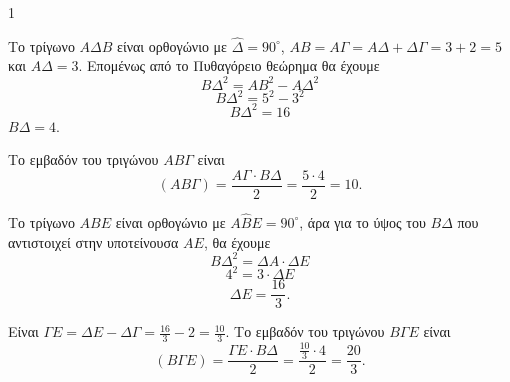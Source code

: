 \begin{ylh}{1}
    \item [ΛΥΣΗ]
\end{ylh}
\begin{alist}
    \item 
    \begin{rlist}
        \item Το τρίγωνο $ΑΔΒ$ είναι ορθογώνιο με $\hat{\Delta} = 90^\circ$,
        $ΑΒ = ΑΓ = ΑΔ + ΔΓ = 3 + 2 = 5$
        και $ΑΔ = 3$.
        Επομένως από το Πυθαγόρειο θεώρημα θα έχουμε
        \[ ΒΔ^2 = ΑΒ^2 - ΑΔ^2 \]
        \[ ΒΔ^2 = 5^2 - 3^2 \]
        \[ ΒΔ^2 = 16 \]
        $ΒΔ = 4$.
        
        \item Το εμβαδόν του τριγώνου $ΑΒΓ$ είναι
        \[ (ΑΒΓ) = \frac{ΑΓ \cdot ΒΔ}{2} = \frac{5 \cdot 4}{2} = 10. \]
    \end{rlist}
    
    \item 
    \begin{rlist}
        \item Το τρίγωνο $ΑΒΕ$ είναι ορθογώνιο με $Α\hat{Β}Ε = 90^\circ$, άρα για το ύψος του $ΒΔ$ που αντιστοιχεί στην υποτείνουσα $ΑΕ$, θα έχουμε
        \[ ΒΔ^2 = ΔΑ \cdot ΔΕ \]
        \[ 4^2 = 3 \cdot ΔΕ \]
        \[ ΔΕ = \frac{16}{3}. \]
        
        \item Είναι $ΓΕ = ΔΕ - ΔΓ = \frac{16}{3} - 2 = \frac{10}{3}$. Το εμβαδόν του τριγώνου $ΒΓΕ$ είναι
        \[ (ΒΓΕ) = \frac{ΓΕ \cdot ΒΔ}{2} = \frac{\frac{10}{3} \cdot 4}{2} = \frac{20}{3}. \]
    \end{rlist}
\end{alist}